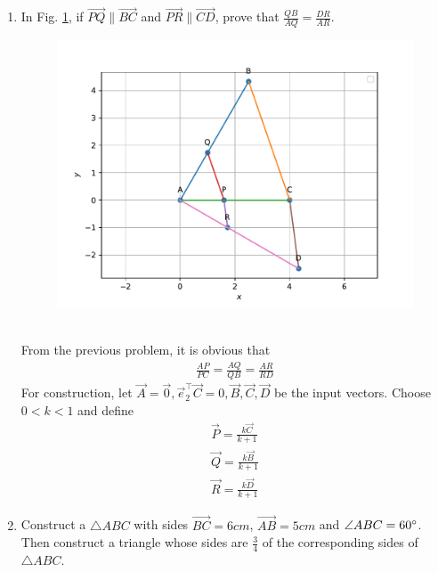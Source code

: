 \documentclass[journal,12pt,twocolumn]{IEEEtran}
\begin{document}
\begin{enumerate}
    \item In 
    Fig. 
	  \ref{fig:matrix-10-11.pdf},
if $\vec{PQ} \parallel \vec{BC}$ and $\vec{PR} \parallel \vec{CD}$, prove that $\frac{QB}{AQ} = \frac{DR}{AR}$.
  \begin{figure}
	  \centering 
	  \includegraphics[width=\columnwidth]{figs/matrix-10-11.pdf}
	  \caption{}
	  \label{fig:matrix-10-11.pdf}
	  \end{figure}
	  \\
%	
\solution
From the previous problem, it is obvious that 
\begin{align}
	\frac{AP}{PC}= 
	\frac{AQ}{QB}= 
	\frac{AR}{RD}
\end{align}
For construction, let $\vec{A} = \vec{0}, \vec{e}_2^{\top}\vec{C} = 0, \vec{B}, \vec{C}, \vec{D} $ be the input vectors.  Choose $0 < k < 1$ and define
\begin{align}
	\vec{P} = \frac{
	k\vec{C}
	}{k+1}
	\\
	\vec{Q} = \frac{
	k\vec{B}
	}{k+1}
	\\
	\vec{R} = \frac{
	k\vec{D}
	}{k+1}
\end{align}
    \item Construct a $\triangle ABC$ with sides $\vec{BC}=6cm$, $\vec{AB} = 5cm$ and $\angle{ABC} = 60\degree$. Then construct a triangle whose sides are $\frac{3}{4}$ of the corresponding sides of $\triangle ABC$.\\

\end{enumerate}
\end{document}
